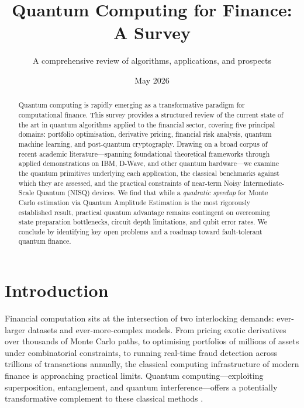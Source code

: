 \documentclass[12pt,a4paper]{article}
\title{\textbf{Quantum Computing for Finance: A Survey}}
\author{A comprehensive review of algorithms, applications, and prospects}
\date{May 2026}
\begin{document}
\maketitle

\begin{abstract}
Quantum computing is rapidly emerging as a transformative paradigm for computational finance. This survey provides a structured review of the current state of the art in quantum algorithms applied to the financial sector, covering five principal domains: portfolio optimisation, derivative pricing, financial risk analysis, quantum machine learning, and post-quantum cryptography. Drawing on a broad corpus of recent academic literature---spanning foundational theoretical frameworks through applied demonstrations on IBM, D-Wave, and other quantum hardware---we examine the quantum primitives underlying each application, the classical benchmarks against which they are assessed, and the practical constraints of near-term Noisy Intermediate-Scale Quantum (NISQ) devices. We find that while a \emph{quadratic speedup} for Monte Carlo estimation via Quantum Amplitude Estimation is the most rigorously established result, practical quantum advantage remains contingent on overcoming state preparation bottlenecks, circuit depth limitations, and qubit error rates. We conclude by identifying key open problems and a roadmap toward fault-tolerant quantum finance.
\end{abstract}

\tableofcontents
\newpage

\section{Introduction}

Financial computation sits at the intersection of two interlocking demands: ever-larger datasets and ever-more-complex models. From pricing exotic derivatives over thousands of Monte Carlo paths, to optimising portfolios of millions of assets under combinatorial constraints, to running real-time fraud detection across trillions of transactions annually, the classical computing infrastructure of modern finance is approaching practical limits. Quantum computing---exploiting superposition, entanglement, and quantum interference---offers a potentially transformative complement to these classical methods \citep{egger_quantum_2020, herman_quantum_2023}.
\end{document}
